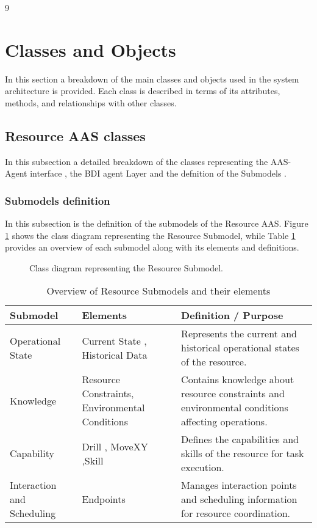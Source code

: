 9\section{Classes and Objects}

In this section a breakdown of the main classes and objects used in the system architecture is provided. Each class is described in terms of its attributes, methods, and relationships with other classes.

\subsection{Resource AAS classes}
In this subsection a detailed breakdown of the classes representing the AAS-Agent interface , the BDI agent Layer and the defnition of the Submodels .

\newpage
\subsubsection{Submodels definition}
In this subsection is the definition of the submodels of the Resource AAS.
Figure \ref{fig:submodel_classes} shows the class diagram representing the Resource Submodel, while Table \ref{tab:submodels_overview} provides an overview of each submodel along with its elements and definitions.
\begin{figure}[htpb]
    \centering
    
    \caption{Class diagram representing the Resource Submodel.}
    \label{fig:submodel_classes}
\end{figure}

\begin{table}[ht]
  \centering
  \caption{Overview of Resource Submodels and their elements}
  \label{tab:submodels_overview}
  \begin{tabularx}{\textwidth}{|l|X|X|}
    \hline
    \textbf{Submodel} & \textbf{Elements} & \textbf{Definition / Purpose} \\
    \hline
    Operational State & Current State , Historical Data & Represents the current and historical operational states of the resource. \\
    \hline
    Knowledge & Resource Constraints, Environmental Conditions & Contains knowledge about resource constraints and environmental conditions affecting operations. \\
    \hline
    Capability & Drill , MoveXY ,Skill & Defines the capabilities and skills of the resource for task execution. \\
    \hline
    Interaction and Scheduling & Endpoints & Manages interaction points and scheduling information for resource coordination. \\
    \hline
  \end{tabularx}
\end{table}

